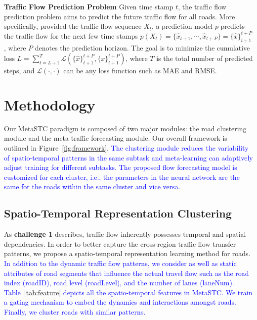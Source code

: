 \documentclass[lettersize,journal]{IEEEtran}
\begin{document}
\textbf{Traffic Flow Prediction Problem}
Given time stamp $t$, the traffic flow prediction problem aims to predict the future traffic flow for all roads. More specifically, provided the traffic flow sequence $X_t$, a prediction model $p$ predicts the traffic flow for the next few time stamps $p(X_t) = \{\hat{x}_{t+1}, \cdots, \hat{x}_{t+P}\}=\{\hat{x}\}_{t+1}^{t+P}$, where $P$ denotes the prediction horizon. The goal is to minimize the cumulative loss $L = \sum_{t = L+1}^T \mathcal{L}(\{\hat{x}\}_{t+1}^{t+P}, \{x\}_{t+1}^{t+P})$, where $T$ is the total number of predicted steps, and $\mathcal{L}(\cdot, \cdot)$ can be any loss function such as MAE and RMSE.




\section{Methodology}

Our MetaSTC paradigm is composed of two major modules: the road clustering module and the meta traffic forecasting module. Our overall framework is outlined in Figure~\ref{fig:framework}. \textcolor{blue}{The clustering module reduces the variability of spatio-temporal patterns in the same subtask and meta-learning can adaptively adjust training for different subtasks. The proposed flow forecasting model is customized for each cluster, i.e., the parameters in the neural network are the same for the roads within the same cluster and vice versa.}

\subsection{Spatio-Temporal Representation Clustering}

As \textbf{challenge 1} describes, traffic flow inherently possesses temporal and spatial dependencies. In order to better capture the cross-region traffic flow transfer patterns, we propose a spatio-temporal representation learning method for roads. \textcolor{blue}{In addition to the dynamic traffic flow patterns, we consider as well as static attributes of road segments that influence the actual travel flow such as the road index (roadID), road level (roadLevel), and the number of lanes (laneNum). Table~\ref{tab:feature} depicts all the spatio-temporal features in MetaSTC. We train a gating mechanism to embed the dynamics and interactions amongst roads. Finally, we cluster roads with similar patterns.}
\end{document}
